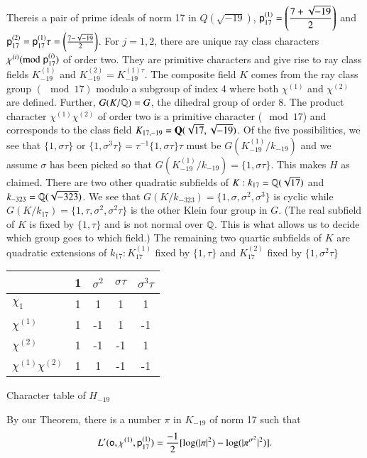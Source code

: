 There\pageoriginale is a pair of prime ideals of norm 17 in $Q(\sqrt{-19})$, $\mathsf{p}^{(1)}_{17} = \left(\dfrac{7+\sqrt{-19}}{2}\right)$ and $\mathsf{p}^{(2)}_{17} = \mathsf{p}^{(1)}_{17} \tau = \left(\frac{7-\sqrt{-19}}{2} \right)$. For $j = 1, 2$, there are unique ray class characters $\chi^{(i)} ({\rm{mod}}\kern.3em \mathsf{p}^{(i)}_{17})$ of order two. They are primitive characters and give rise to ray class fields $K^{(1)}_{-19}$ and $K^{(2)}_{-19} = K^{(1) \tau}_{-19}$. The composite field $K$ comes from the ray class group $(\mod 17)$ modulo a subgroup of index 4 where both $\chi^{(1)}$ and $\chi^{(2)}$ are defined. Further, $G (K/\mathbb{Q}) = G$, the dihedral group of order 8. The product character $\chi^{(1)} \chi^{(2)}$  of order two is a primitive character ($\mod 17$) and corresponds to the class field $K_{17, -19 } = \mathbf{Q} (\sqrt{17}, \sqrt{-19})$. Of the five possibilities, we see that $\{1, \sigma \tau\}$ or $\{1, \sigma^3 \tau\} = \tau^{-1} \{1, \sigma \tau\} \tau$ must be $G (K^{(1)}_{-19}/k_{-19})$ and we assume $\sigma $ has been picked so that $G(K^{(1)}_{-19}/ k_{-19}) = \{1, \sigma \tau\}$. This makes $H$ as claimed. There are two other quadratic subfields of $K: k_{17} = \mathbb{Q} (\sqrt{17})$ and $k_{-323} = \mathbb{Q} (\sqrt{-323})$. We see that $G(K/k_{-323}) =\{1, \sigma , \sigma^2, \sigma^3\}$ is cyclic while $G(K/k_{17}) =\{1, \tau, \sigma^2, \sigma^2 \tau\}$ is the other Klein four group in $G$. (The real subfield of $K$ is fixed by $\{1, \tau\}$ and is not normal over $\mathbb{Q}$. This is what allows us to decide which group goes to which field.) The remaining two quartic subfields of $K$ are quadratic extensions of $k_{17} : K^{(1)}_{17}$ fixed by $\{1,\tau\}$ and $K^{(2)}_{17}$ fixed by $\{1, \sigma^2 \tau\}$
\begin{center}
{\renewcommand{\arraystretch}{1.2}
\tabcolsep=12pt
\begin{tabular}{l|c|c|c|c}
\hline
& 1 & $\sigma^2$  & $\sigma \tau$ & $\sigma^3 \tau$\\\hline
$\chi_1$ & 1 & 1 & 1& 1\\\hline
$\chi^{(1)}$ &1&-1&1&-1\\\hline
$\chi^{(2)}$ &1&-1&-1&1\\\hline
$\chi^{(1)} \chi^{(2)}$ & 1&1&-1&-1\\\hline
\end{tabular}}

\smallskip
Character table of $H_{-19}$
\end{center}
By our Theorem, there is a number $\pi$ in $K_{-19}$ of norm 17 such that 
$$
L' (\mathsf{o}, \chi^{(1)}, \mathsf{p}^{(1)}_{17}) = \frac{-1}{2} [\log (|\pi|^2) - \log (|\pi^{\sigma^2}|^2)].
$$
